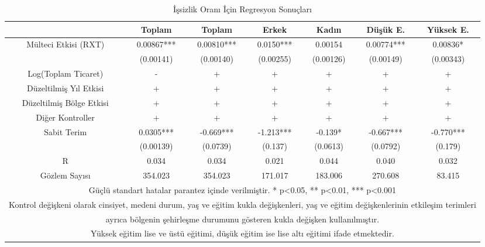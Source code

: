 \documentclass{article}
\begin{document}
\begin{justify}
        \FloatBarrier
        \begin{table}[h]
            \centering
            \caption{İşsizlik Oranı İçin Regresyon Sonuçları}
            \begin{tabular}{|ccccccc|}
                \hline
                     & Toplam & Toplam & Erkek & Kadın & Düşük E. & Yüksek E. \\ \hline
                     Mülteci Etkisi (RXT) & 0.00867*** & 0.00810*** & 0.0150*** & 0.00154 & 0.00774*** & 0.00836*   \\ 
                     & (0.00141) & (0.00140) & (0.00255) & (0.00126) & (0.00149) & (0.00343)    \\ 
                    Log(Toplam Ticaret) & - & + & + & + & + & + \\ 
                    Düzeltilmiş Yıl Etkisi & + & + & + & + & + & + \\ 
                    Düzeltilmiş Bölge Etkisi & + & + & + & + & + & + \\ 
                    Diğer Kontroller & + & + & + & + & + & + \\
                    Sabit Terim & 0.0305*** & -0.669*** & -1.213*** & -0.139* & -0.667*** & -0.770*** \\ 
                    & (0.00139) & (0.0739) & (0.137) & (0.0613) & (0.0792) & (0.179)    \\
                    R & 0.034 & 0.034 & 0.021 & 0.044 & 0.040 & 0.032    \\ 
                    Gözlem Sayısı & 354.023 & 354.023 & 171.017 & 183.006 & 270.608 & 83.415 \\ \hline
                    \multicolumn{7}{|c|}{\scriptsize Güçlü standart hatalar parantez içinde verilmiştir.   * p<0.05, ** p<0.01, *** p<0.001}\\ \hline
                    \multicolumn{7}{|c|}{\scriptsize Kontrol değişkeni olarak cinsiyet, medeni durum, yaş ve eğitim kukla değişkenleri, yaş ve eğitim değişkenlerinin etkileşim terimleri} \\ 
                    \multicolumn{7}{|c|}{\scriptsize ayrıca bölgenin şehirleşme durumunu gösteren kukla değişken kullanılmıştır.} \\ \hline
                    \multicolumn{7}{|c|}{\scriptsize Yüksek eğitim lise ve üstü eğitimi, düşük eğitim ise lise altı eğitimi ifade etmektedir.} \\ \hline

                \end{tabular}
        \end{table}
        \FloatBarrier


\end{justify}
\end{document}
